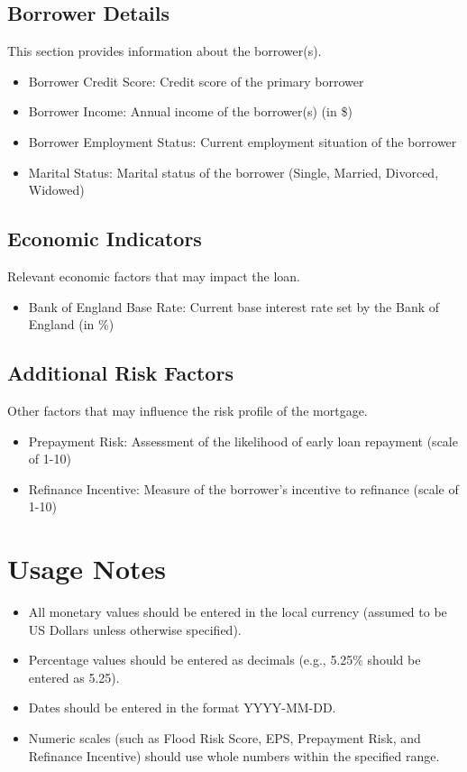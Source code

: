 \documentclass[12pt,a4paper]{article}
\begin{document}
\subsection{Borrower Details}
This section provides information about the borrower(s).

\begin{itemize}
  \item Borrower Credit Score: Credit score of the primary borrower
  \item Borrower Income: Annual income of the borrower(s) (in \$)
  \item Borrower Employment Status: Current employment situation of the borrower
  \item Marital Status: Marital status of the borrower (Single, Married, Divorced, Widowed)
\end{itemize}

\subsection{Economic Indicators}
Relevant economic factors that may impact the loan.

\begin{itemize}
  \item Bank of England Base Rate: Current base interest rate set by the Bank of England (in \%)
\end{itemize}

\subsection{Additional Risk Factors}
Other factors that may influence the risk profile of the mortgage.

\begin{itemize}
  \item Prepayment Risk: Assessment of the likelihood of early loan repayment (scale of 1-10)
  \item Refinance Incentive: Measure of the borrower's incentive to refinance (scale of 1-10)
\end{itemize}

\section{Usage Notes}
\begin{itemize}
  \item All monetary values should be entered in the local currency (assumed to be US Dollars unless otherwise specified).
  \item Percentage values should be entered as decimals (e.g., 5.25\% should be entered as 5.25).
  \item Dates should be entered in the format YYYY-MM-DD.
  \item Numeric scales (such as Flood Risk Score, EPS, Prepayment Risk, and Refinance Incentive) should use whole numbers within the specified range.
\end{itemize}
\end{document}
